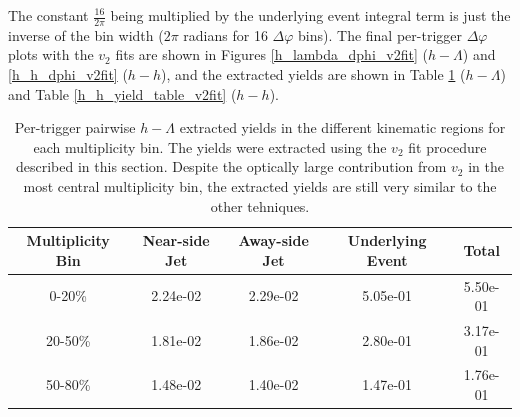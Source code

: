 \documentclass[ALICE,manyauthors]{ALICE_analysis_notes}
\begin{document}
The constant $\frac{16}{2\pi}$ being multiplied by the underlying event integral term is just the inverse of the bin width ($2\pi$ radians for 16 $\Delta\varphi$ bins). The final per-trigger $\Delta\varphi$ plots with the $v_{2}$ fits are shown in Figures \ref{h_lambda_dphi_v2fit} ($h-\Lambda$) and \ref{h_h_dphi_v2fit} ($h-h$), and the extracted yields are shown in Table \ref{h_lambda_yield_table_v2fit} ($h-\Lambda$) and Table \ref{h_h_yield_table_v2fit} ($h-h$). 

\begin{table}[h!]
\centering
\begin{tabular}{| c | c | c | c | c | }
\hline
Multiplicity Bin & Near-side Jet & Away-side Jet & Underlying Event & Total  \\
\hline
	
0-20\% & 2.24e-02  & 2.29e-02  & 5.05e-01 & 5.50e-01 \\
20-50\% & 1.81e-02 & 1.86e-02  & 2.80e-01 & 3.17e-01 \\
50-80\% & 1.48e-02 & 1.40e-02  & 1.47e-01 & 1.76e-01 \\
	
\hline
\end{tabular}
\caption{Per-trigger pairwise $h-\Lambda$ extracted yields in the different kinematic regions for each multiplicity bin. The yields were extracted using the $v_{2}$ fit procedure described in this section. Despite the optically large contribution from $v_{2}$ in the most central multiplicity bin, the extracted yields are still very similar to the other tehniques.}
\label{h_lambda_yield_table_v2fit}
\end{table}
	


\clearpage
\end{document}
